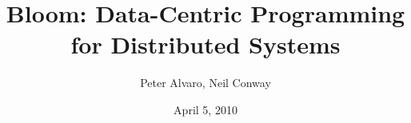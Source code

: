\documentclass{article}
\begin{document}
\title{Bloom: Data-Centric Programming for Distributed Systems}
\author{Peter Alvaro, Neil Conway}
\date{April 5, 2010}

\maketitle
\thispagestyle{empty}
\pagestyle{empty}






\newpage


\end{document}
